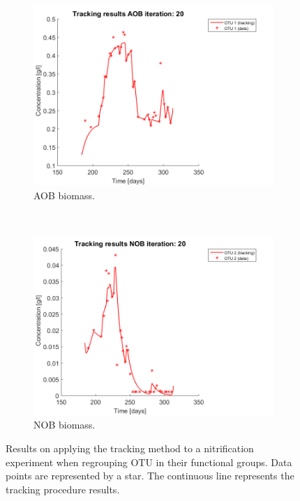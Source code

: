\documentclass[processes,article,submit,moreauthors,pdftex]{Definitions/mdpi}
\begin{document}
\begin{figure}[h]
\begin{subfigure}{0.45 \linewidth}
		\includegraphics[width=\textwidth]{Application/200407_regroup_OTU_try2_iter_20_AOB_plot_1}
		\caption{AOB biomass.}
		\label{AOB application}
	\end{subfigure}
	~
	\begin{subfigure}{0.45 \linewidth}
		\includegraphics[width=\textwidth]{Application/200407_regroup_OTU_try2_iter_20_NOB_plot_1}
		\caption{NOB biomass.}
		\label{NOB application}
	\end{subfigure}
	\caption{Results on applying the tracking method to a nitrification experiment when regrouping OTU in their functional groups. Data points are represented by a star. The continuous line represents the tracking procedure results.}
	\label{regroup_results}
\end{figure}
\end{document}
